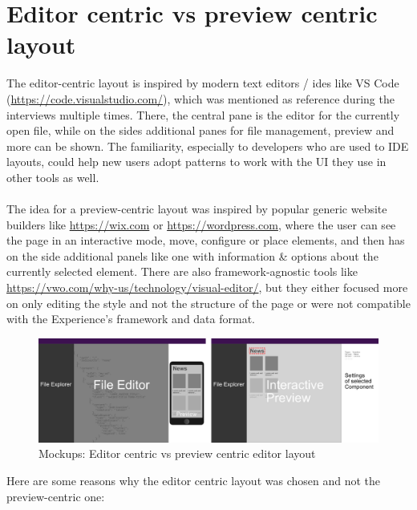 \section{Editor centric vs preview centric layout}
The editor-centric layout is inspired by modern text editors / \Gls{ide}s like VS Code (\url{https://code.visualstudio.com/}), which was mentioned as reference during the interviews multiple times.
There, the central pane is the editor for the currently open file, while on the sides additional panes for file management, preview and more can be shown.
The familiarity, especially to developers who are used to IDE layouts, could help new users adopt patterns to work with the UI they use in other tools as well.
\\\\
The idea for a preview-centric layout was inspired by popular generic website builders like \url{https://wix.com} or \url{https://wordpress.com}, where the user
can see the page in an interactive mode, move, configure or place elements, and then has on the side additional panels like one with information \& options about the
currently selected element.
There are also framework-agnostic tools like \url{https://vwo.com/why-us/technology/visual-editor/}, but they either focused more on only editing the style and not the structure of the page or were not
compatible with the Experience's framework and data format. 
\begin{figure}[h]
  \includegraphics[width=\textwidth]{pics/editor_centric_vs_preview_centric.png}
  \caption{Mockups: Editor centric vs preview centric editor layout}
\end{figure}
Here are some reasons why the editor centric layout was chosen and not the preview-centric one:
